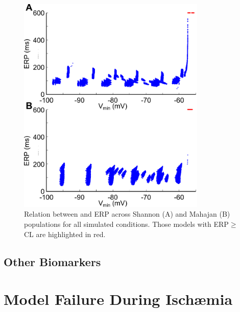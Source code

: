\documentclass[../thesis-main.tex]{subfiles}
\begin{document}
\begin{figure}
 \centering
 \includegraphics[width=0.8\textwidth]{population-vmin_erp}
 \caption[Relation between \vrest{} and ERP across both populations for all simulated conditions.]{Relation between \vrest{} and ERP across Shannon (A) and Mahajan (B) populations for all simulated conditions. Those models with ERP$\ge$CL are highlighted in red.}
 \label{fig:population-vmin_erp}
\end{figure}


\subsection{Other Biomarkers}
\label{subsec:isch-other-response}

\section{Model Failure During Isch\ae{}mia}
\label{sec:isch-modelFailure}
\end{document}
